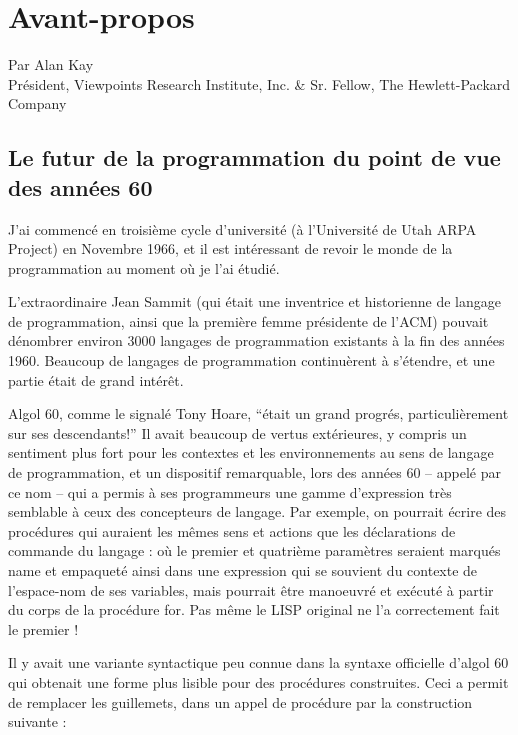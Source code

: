 \documentclass[a4paper,10pt,twoside]{book}
\begin{document}
    \sloppy
\fi
\chapter*{Avant-propos}

Par Alan Kay \\
Pr\'esident, Viewpoints Research Institute, Inc. \& Sr. Fellow, 
The Hewlett-Packard Company 



\section*{Le futur de la programmation du point de vue des ann\'ees 60}
J'ai commenc\'e en troisi\`eme cycle d'universit\'e (\`a l'Universit\'e de Utah ARPA Project) en Novembre 1966, et il est int\'eressant de revoir le monde de la programmation au moment o\`u je l'ai \'etudi\'e.
	
L'extraordinaire Jean Sammit (qui \'etait une inventrice et historienne de langage de programmation,  ainsi que la premi\`ere femme pr\'esidente de l'ACM) pouvait  d\'enombrer environ 3000 langages de programmation existants \`a la fin des ann\'ees 1960. Beaucoup de langages de programmation continu\`erent \`a s'\'etendre, et une partie \'etait de grand int\'er\^et.

Algol 60, comme le signal\'e Tony Hoare, ``\'etait un grand progr\'es, particuli\`erement sur ses descendants!'' Il avait beaucoup de vertus ext\'erieures, y compris un sentiment plus fort pour les contextes et les environnements au sens de langage de programmation, et un dispositif remarquable, lors des ann\'ees 60 -- appel\'e par ce nom -- qui a permis \`a ses programmeurs une gamme d'expression tr\`es semblable \`a ceux des concepteurs de langage. Par exemple, on pourrait \'ecrire des proc\'edures qui auraient les m\^emes sens et actions que les d\'eclarations de commande du langage :
  o\`u le premier et quatri\`eme param\`etres seraient marqu\'es name et empaquet\'e ainsi dans une expression qui se souvient du contexte de l'espace-nom de ses variables, mais pourrait \^etre manoeuvr\'e et ex\'ecut\'e \`a partir du corps de la proc\'edure for. Pas m\^eme le LISP original ne l'a correctement fait le premier !

Il y avait une variante syntactique peu connue dans la syntaxe officielle d'algol 60 qui obtenait une forme plus lisible pour des proc\'edures construites. Ceci a permit de remplacer les guillemets, dans un appel de proc\'edure par la construction suivante :
\end{document}
